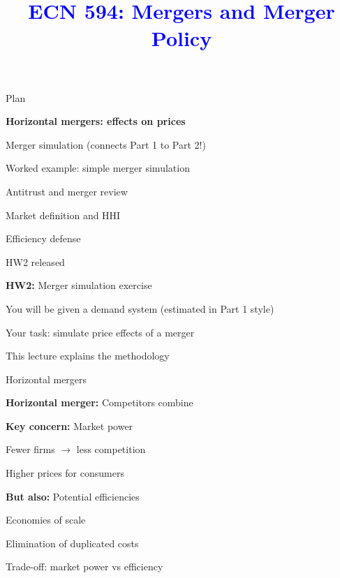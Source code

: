 \documentclass[notes,11pt, aspectratio=169]{beamer}
\title[]{\textcolor{blue}{ECN 594: Mergers and Merger Policy}}
\author[PGP]{}
\institute[FRBNY]{\small{\begin{tabular}{c c c}
Nicholas Vreugdenhil \\
\end{tabular}}}
\date{}
\newenvironment{wideitemize}{\itemize\addtolength{\itemsep}{10pt}}{\enditemize}
\newenvironment{wideenumerate}{\enumerate\addtolength{\itemsep}{10pt}}{\endenumerate}
\begin{document}
\begin{frame}
\maketitle
  \centering
\end{frame}

\begin{frame}{Plan}
  \begin{wideenumerate}
    \item \textbf{Horizontal mergers: effects on prices}
    \item Merger simulation (connects Part 1 to Part 2!)
    \item Worked example: simple merger simulation
    \item Antitrust and merger review
    \item Market definition and HHI
    \item Efficiency defense
  \end{wideenumerate}
\end{frame}

\begin{frame}{HW2 released}
	\begin{wideitemize}
		\item \textbf{HW2:} Merger simulation exercise
		\item You will be given a demand system (estimated in Part 1 style)
		\item Your task: simulate price effects of a merger
		\item This lecture explains the methodology
	\end{wideitemize}
\end{frame}


\begin{frame}{Horizontal mergers}
	\begin{wideitemize}
		\item \textbf{Horizontal merger:} Competitors combine
		\item \textbf{Key concern:} Market power
		\begin{wideitemize}
			\vspace{5pt}
			\item Fewer firms $\rightarrow$ less competition
			\item Higher prices for consumers
		\end{wideitemize}
		\item \textbf{But also:} Potential efficiencies
		\begin{wideitemize}
			\vspace{5pt}
			\item Economies of scale
			\item Elimination of duplicated costs
		\end{wideitemize}
		\item Trade-off: market power vs efficiency
	\end{wideitemize}
\end{frame}
\end{document}
